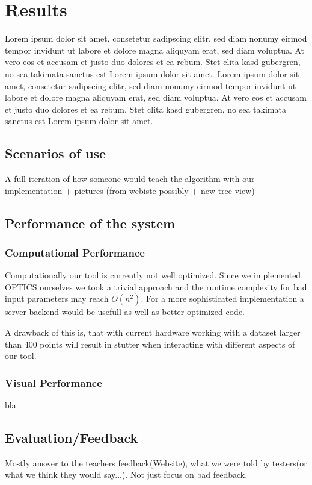 \documentclass{vgtc}                          %
\begin{document}
\section{Results}

Lorem ipsum dolor sit amet, consetetur sadipscing elitr, sed diam
nonumy eirmod tempor invidunt ut labore et dolore magna aliquyam erat,
sed diam voluptua. At vero eos et accusam et justo duo dolores et ea
rebum. Stet clita kasd gubergren, no sea takimata sanctus est Lorem
ipsum dolor sit amet. Lorem ipsum dolor sit amet, consetetur
sadipscing elitr, sed diam nonumy eirmod tempor invidunt ut labore et
dolore magna aliquyam erat, sed diam voluptua. At vero eos et accusam
et justo duo dolores et ea rebum. Stet clita kasd gubergren, no sea
takimata sanctus est Lorem ipsum dolor sit amet.

\subsection{Scenarios of use}
A full iteration of how someone would teach the algorithm with our implementation + pictures (from webiste possibly + new tree view)
\subsection{Performance of the system}
\subsubsection{Computational Performance}
\begin{flushleft}
Computationally our tool is currently not well optimized. Since we implemented OPTICS ourselves we took a trivial approach and the runtime complexity for bad input parameters may reach $ O(n^{2}) $. For a more sophisticated implementation a server backend would be usefull as well as better optimized code.
\end{flushleft}
\begin{flushleft}
A drawback of this is, that with current hardware working with a dataset larger than 400 points will result in stutter when interacting with different aspects of our tool.
\end{flushleft}
\subsubsection{Visual Performance}
bla

\subsection{Evaluation/Feedback}
Mostly answer to the teachers feedback(Website), what we were told by testers(or what we think they would say...). Not just focus on bad feedback. 
\end{document}
